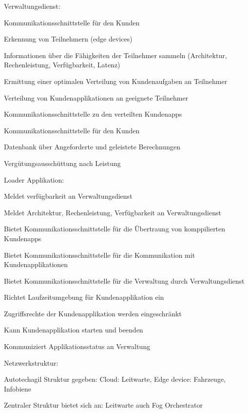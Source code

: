 \begin{notes}
\begin{notes}
        \item Verwaltungsdienst:
        \begin{notes}
            \item Kommunikationsschnittstelle für den Kunden
            \item Erkennung von Teilnehmern (edge devices)
            \item Informationen über die Fähigkeiten der Teilnehmer sammeln (Architektur, Rechenleistung, Verfügbarkeit, Latenz)
            \item Ermittung einer optimalen Verteilung von Kundenaufgaben an Teilnehmer
            \item Verteilung von Kundenapplikationen an geeignete Teilnehmer
            \item Kommunikationsschnittstelle zu den verteilten Kundenapps
            \item Kommunikationsschnittstelle für den Kunden
            \item Datenbank über Angeforderte und geleistete Berechnungen
            \item Vergütungsausschüttung nach Leistung
        \end{notes}
        \item Loader Applikation:
        \begin{notes}
            \item Meldet verfügbarkeit an Verwaltungsdienst
            \item Meldet Architektur, Rechenleistung, Verfügbarkeit an Verwaltungsdienst
            \item Bietet Kommunikationsschnittstelle für die Übertraung von komppilierten Kundenapps
            \item Bietet Kommunikationsschnittstelle für die Kommunikation mit Kundenapplikationen
            \item Bietet Kommunikationsschnittstelle für die Verwaltung durch Verwaltungsdienst
            \item Richtet Laufzeitumgebung für Kundenapplikation ein
            \item Zugriffsrechte der Kundenapplikation werden eingeschränkt
            \item Kann Kundenapplikation starten und beenden
            \item Kommuniziert Applikationsstatus an Verwaltung
        \end{notes}


    \end{notes}
    \item Netzwerkstruktur:
    \begin{notes}
        \item Autotechagil Struktur gegeben: Cloud: Leitwarte, Edge device: Fahrzeuge, Infobiene
        \item Zentraler Struktur bietet sich an: Leitwarte auch Fog Orchestrator
        \item 
    \end{notes}
\end{notes}

